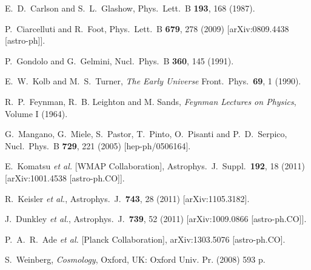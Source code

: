 \documentclass[12pt]{article}
\begin{document}
{{\begin{thebibliography}{999}
 E.~D.~Carlson and S.~L.~Glashow,
 Phys.\ Lett.\ B {\bf 193}, 168 (1987).
  
  P.~Ciarcelluti and R.~Foot,
  Phys.\ Lett.\ B {\bf 679}, 278 (2009)
  [arXiv:0809.4438 [astro-ph]].
  
  P.~Gondolo and G.~Gelmini,
  Nucl.\ Phys.\ B {\bf 360}, 145 (1991).

  E.~W.~Kolb and M.~S.~Turner,
  {\it The Early Universe}
  Front.\ Phys.\  {\bf 69}, 1 (1990).
  
  R.~P.~Feynman, R.~B. Leighton and M. Sands, {\it Feynman Lectures on Physics}, Volume I (1964). 
 
  G.~Mangano, G.~Miele, S.~Pastor, T.~Pinto, O.~Pisanti and P.~D.~Serpico,
  Nucl.\ Phys.\ B {\bf 729}, 221 (2005)
  [hep-ph/0506164].
  
  E.~Komatsu {\it et al.}  [WMAP Collaboration],
  Astrophys.\ J.\ Suppl.\  {\bf 192}, 18 (2011)
  [arXiv:1001.4538 [astro-ph.CO]].
  
   R.~Keisler {\it et al.},
Astrophys.\ J.\  {\bf 743}, 28 (2011) [arXiv:1105.3182].
  
  J.~Dunkley {\it et al.},
  Astrophys.\ J.\  {\bf 739}, 52 (2011)
  [arXiv:1009.0866 [astro-ph.CO]].
 
  P.~A.~R.~Ade {\it et al.}  [Planck Collaboration],
  arXiv:1303.5076 [astro-ph.CO].
  
  S.~Weinberg,
  {\it Cosmology},
  Oxford, UK: Oxford Univ. Pr. (2008) 593 p.
  

\end{thebibliography}}}
\end{document}
